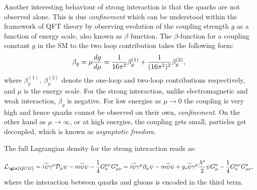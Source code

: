 Another interesting behaviour of strong interaction is that the quarks are not observed alone. This is due \textit{confinement} which can be understood within the framework of \gls{QFT} theory by observing evolution of the coupling strength $g$ as a function of energy scale, also known as $\beta$ function.
The $\beta$-function for a coupling constant $g$ in the \gls{SM} to the two loop contribution takes the following form:
\begin{equation}
\beta_g = \mu {{d g}\over d \mu} = {1\over16\pi^2} \beta_g^{(1)}
+ {1\over(16\pi^2)^2} \beta_g^{(2)},
\end{equation}
where $\beta_g^{(1)},~ \beta_g^{(2)}$ denote the one-loop and two-loop
contributions respectively, and $\mu$ is the energy scale. For the strong interaction, unlike electromagnetic and weak interaction, $\beta_g$ is negative. For low energies as $\mu \rightarrow 0$ the coupling is very high and hence quarks cannot be observed on their own, \textit{confinement}. On the other hand as $\mu \rightarrow \infty$, or at high energies, the coupling gets small, particles get decoupled, which is known as \textit{asymptotic freedom}. 

The full Lagrangian density for the strong interaction reads as:

\begin{equation}
	\mathcal{L}_{\gls{QCD}} = i\overline{\psi}\gamma^{\mu}\mathcal{D}_{\mu}\psi - m\overline{\psi}\psi -\frac{1}{4} G_{a}^{\mu\nu}G^{a}_{\mu\nu} = i\overline{\psi}\gamma^{\mu}\partial_{\mu}\psi - m\overline{\psi}\psi + g_{s}\overline{\psi}\gamma^{\mu}\frac{\lambda^{a}}{2}\psi G^{a}_{\mu} -\frac{1}{4} G_{a}^{\mu\nu}G^{a}_{\mu\nu},
\label{eq:lag_fourth}
\end{equation}
where the interaction between quarks and gluons is encoded in the third term.


